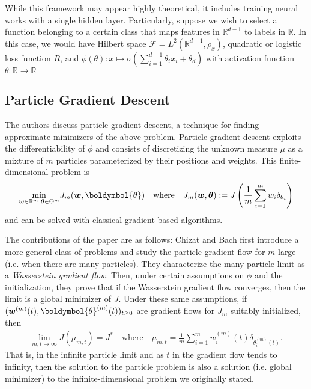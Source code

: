 \documentclass{article}
\begin{document}
While this framework may appear highly theoretical, it includes training neural works with a single hidden layer. Particularly, suppose we wish to select a function belonging to a certain class that maps features in $\mathbb{R}^{d-1}$ to labels in $\mathbb{R}$. In this case, we would have Hilbert space $\mathcal{F} = L^2(\mathbb{R}^{d-1}, \rho_x)$, quadratic or logistic loss function $R$, and $\phi(\theta): x \mapsto \sigma(\sum_{i=1}^{d-1} \theta_i x_i + \theta_d)$ with activation function $\theta: \mathbb{R} \rightarrow \mathbb{R}$

\subsection{Particle Gradient Descent}
The authors discuss particle gradient descent, a technique for finding approximate minimizers of the above problem. Particle gradient descent exploits the differentiability of $\phi$ and consists of discretizing the unknown measure $\mu$ as a mixture of $m$ particles parameterized by their positions and weights. This finite-dimensional problem is
\begin{align*}
    \underset{\boldsymbol{w} \in \mathbb{R}^m, \boldsymbol{\theta} \in \Theta^m}{\min} J_m(\boldsymbol{w}, \boldymbol{\theta}) \quad \text{where} \quad J_m(\boldsymbol{w}, \boldsymbol{\theta}) := J \left( \frac{1}{m} \sum_{i=1}^m w_i \delta_{\theta_i} \right)
\end{align*}
and can be solved with classical gradient-based algorithms.

The contributions of the paper are as follows: Chizat and Bach first introduce a more general class of problems and study the particle gradient flow for $m$ large (i.e. when there are many particles). They characterize the many particle limit as a \textit{Wasserstein gradient flow}. Then, under certain assumptions on $\phi$ and the initialization, they prove that if the Wasserstein gradient flow converges, then the limit is a global minimizer of $J$. Under these same assumptions, if
$(\boldsymbol{w}^{(m)}(t), \boldymbol{\theta}^{(m)}(t))_{t \geq 0}$ are gradient flows for $J_m$ suitably initialized, then 
\begin{align*}
    \lim_{m , t \rightarrow \infty} J(\mu_{m, t}) = J^* \quad \text{where} \quad \mu_{m,t} = \frac{1}{m} \sum_{i=1}^m w_i^{(m)}(t) \delta_{\theta_i^{(m)}(t)}.
\end{align*}
That is, in the infinite particle limit and as $t$ in the gradient flow tends to infinity, then the solution to the particle problem is also a solution (i.e. global minimizer) to the infinite-dimensional problem we originally stated.
\end{document}
